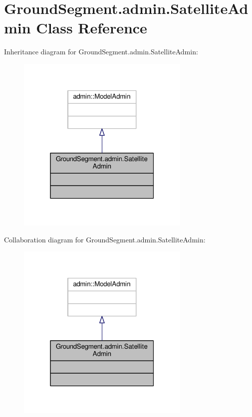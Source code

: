 \hypertarget{class_ground_segment_1_1admin_1_1_satellite_admin}{}\section{Ground\+Segment.\+admin.\+Satellite\+Admin Class Reference}
\label{class_ground_segment_1_1admin_1_1_satellite_admin}


Inheritance diagram for Ground\+Segment.\+admin.\+Satellite\+Admin\+:\nopagebreak
\begin{figure}[H]
\begin{center}
\leavevmode
\includegraphics[width=235pt]{class_ground_segment_1_1admin_1_1_satellite_admin__inherit__graph}
\end{center}
\end{figure}


Collaboration diagram for Ground\+Segment.\+admin.\+Satellite\+Admin\+:\nopagebreak
\begin{figure}[H]
\begin{center}
\leavevmode
\includegraphics[width=235pt]{class_ground_segment_1_1admin_1_1_satellite_admin__coll__graph}
\end{center}
\end{figure}


